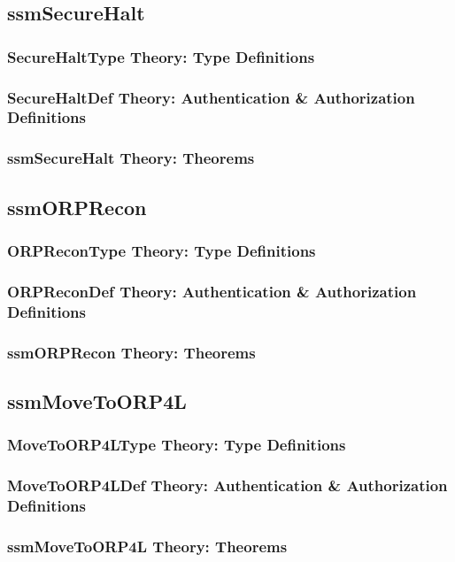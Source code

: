 \documentclass[hidelinks,12pt,a4paper]{report}
\begin{document}
\begin{appendices}
\subsection{ssmSecureHalt}
\subsubsection{SecureHaltType Theory: Type Definitions}
\subsubsection{SecureHaltDef Theory: Authentication \& Authorization Definitions}
\subsubsection{ssmSecureHalt Theory: Theorems}

\subsection{ssmORPRecon}
\subsubsection{ORPReconType Theory: Type Definitions}
\subsubsection{ORPReconDef Theory: Authentication \& Authorization Definitions}
\subsubsection{ssmORPRecon Theory: Theorems}

\subsection{ssmMoveToORP4L}
\subsubsection{MoveToORP4LType Theory: Type Definitions}
\subsubsection{MoveToORP4LDef Theory: Authentication \& Authorization Definitions}
\subsubsection{ssmMoveToORP4L Theory: Theorems}


\end{appendices}
\end{document}
